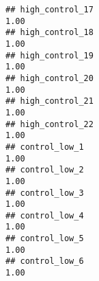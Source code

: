 \documentclass[
]{article}
\begin{document}
\begin{verbatim}
## high_control_17                                                                                                                                                                                                             1.00
## high_control_18                                                                                                                                                                                                             1.00
## high_control_19                                                                                                                                                                                                             1.00
## high_control_20                                                                                                                                                                                                             1.00
## high_control_21                                                                                                                                                                                                             1.00
## high_control_22                                                                                                                                                                                                             1.00
## control_low_1                                                                                                                                                                                                               1.00
## control_low_2                                                                                                                                                                                                               1.00
## control_low_3                                                                                                                                                                                                               1.00
## control_low_4                                                                                                                                                                                                               1.00
## control_low_5                                                                                                                                                                                                               1.00
## control_low_6                                                                                                                                                                                                               1.00

\end{verbatim}
\end{document}
